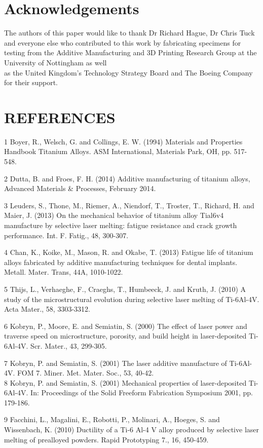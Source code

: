 \documentclass[10pt]{article}
\begin{document}
\section*{Acknowledgements}
The authors of this paper would like to thank Dr Richard Hague, Dr Chris Tuck and everyone else who contributed to this work by fabricating specimens for testing from the Additive Manufacturing and 3D Printing Research Group at the University of Nottingham as well\\
as the United Kingdom's Technology Strategy Board and The Boeing Company for their support.

\section*{REFERENCES}
1 Boyer, R., Welsch, G. and Collings, E. W. (1994) Materials and Properties Handbook Titanium Alloys. ASM International, Materials Park, OH, pp. 517-548.

2 Dutta, B. and Froes, F. H. (2014) Additive manufacturing of titanium alloys, Advanced Materials \& Processes, February 2014.

3 Leuders, S., Thone, M., Riemer, A., Niendorf, T., Troster, T., Richard, H. and Maier, J. (2013) On the mechanical behavior of titanium alloy Tial6v4 manufacture by selective laser melting: fatigue resistance and crack growth performance. Int. F. Fatig., 48, 300-307.

4 Chan, K., Koike, M., Mason, R. and Okabe, T. (2013) Fatigue life of titanium alloys fabricated by additive manufacturing techniques for dental implants. Metall. Mater. Trans, 44A, 1010-1022.

5 Thijs, L., Verhaeghe, F., Craeghs, T., Humbeeck, J. and Kruth, J. (2010) A study of the microstructural evolution during selective laser melting of Ti-6Al-4V. Acta Mater., 58, 3303-3312.

6 Kobryn, P., Moore, E. and Semiatin, S. (2000) The effect of laser power and traverse speed on microstructure, porosity, and build height in laser-deposited Ti-6Al-4V. Scr. Mater., 43, 299-305.

7 Kobryn, P. and Semiatin, S. (2001) The laser additive manufacture of Ti-6Al-4V. FOM 7. Miner. Met. Mater. Soc., 53, 40-42.\\
8 Kobryn, P. and Semiatin, S. (2001) Mechanical properties of laser-deposited Ti-6Al-4V. In: Proceedings of the Solid Freeform Fabrication Symposium 2001, pp. 179-186.

9 Facchini, L., Magalini, E., Robotti, P., Molinari, A., Hoeges, S. and Wissenbach, K. (2010) Ductility of a Ti-6 Al-4 V alloy produced by selective laser melting of prealloyed powders. Rapid Prototyping 7., 16, 450-459.
\end{document}
